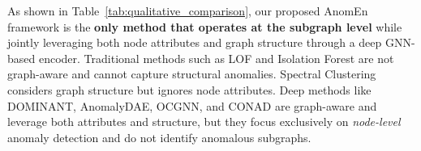 \begin{table}[ht]
\centering
\caption{Qualitative Comparison of AnomEn with Existing Graph Anomaly Detection Methods}
\label{tab:qualitative_comparison}
\end{table}

As shown in Table~\ref{tab:qualitative_comparison}, our proposed AnomEn framework is the \textbf{only method that operates at the subgraph level} while jointly leveraging both node attributes and graph structure through a deep GNN-based encoder. Traditional methods such as LOF and Isolation Forest are not graph-aware and cannot capture structural anomalies. Spectral Clustering considers graph structure but ignores node attributes. Deep methods like DOMINANT, AnomalyDAE, OCGNN, and CONAD are graph-aware and leverage both attributes and structure, but they focus exclusively on \textit{node-level} anomaly detection and do not identify anomalous subgraphs.

